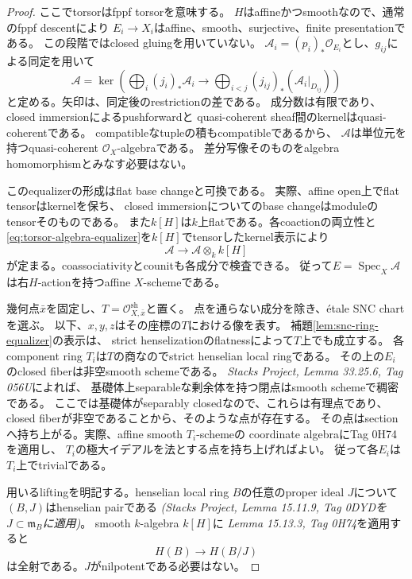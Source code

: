 \documentclass[uplatex,dvipdfmx,11pt]{jsarticle}
\numberwithin{equation}{section}
\theoremstyle{plain}
\theoremstyle{definition}
\theoremstyle{remark}
\DeclareMathOperator{\Spec}{Spec}
\newcommand{\OO}{\mathcal O}
\begin{document}
\begin{proof}
ここでtorsorはfppf torsorを意味する。
$H$はaffineかつsmoothなので、通常のfppf descentにより
$E_i\to X_i$はaffine、smooth、surjective、finite presentationである。
この段階ではclosed gluingを用いていない。
$\mathcal A_i=(p_i)_*\OO_{E_i}$とし、$g_{ij}$による同定を用いて
\begin{equation}\label{eq:torsor-algebra-equalizer}
\mathcal A=\ker\left(
\bigoplus_i(j_i)_*\mathcal A_i\longrightarrow
\bigoplus_{i<j}(j_{ij})_*(\mathcal A_i|_{D_{ij}})
\right)
\end{equation}
と定める。矢印は、同定後のrestrictionの差である。
成分数は有限であり、closed immersionによるpushforwardと
quasi-coherent sheaf間のkernelはquasi-coherentである。
compatibleなtupleの積もcompatibleであるから、
$\mathcal A$は単位元を持つquasi-coherent $\OO_X$-algebraである。
差分写像そのものをalgebra homomorphismとみなす必要はない。

このequalizerの形成はflat base changeと可換である。
実際、affine open上でflat tensorはkernelを保ち、
closed immersionについてのbase changeはmoduleのtensorそのものである。
また$k[H]$は$k$上flatである。各coactionの両立性と
\eqref{eq:torsor-algebra-equalizer}を$k[H]$でtensorしたkernel表示により
\[
\mathcal A\longrightarrow\mathcal A\otimes_k k[H]
\]
が定まる。coassociativityとcounitも各成分で検査できる。
従って$E=\Spec_X\mathcal A$は右$H$-actionを持つaffine $X$-schemeである。

幾何点$\bar x$を固定し、$T=\OO^{\mathrm{sh}}_{X,\bar x}$と置く。
点を通らない成分を除き、étale SNC chartを選ぶ。
以下、$x,y,z$はその座標の$T$における像を表す。
補題\ref{lem:snc-ring-equalizer}の表示は、
strict henselizationのflatnessによって$T$上でも成立する。
各component ring $T_i$は$T$の商なのでstrict henselian local ringである。
その上の$E_i$のclosed fiberは非空smooth schemeである。
\emph{Stacks Project, Lemma 33.25.6, Tag 056U}によれば、
基礎体上separableな剰余体を持つ閉点はsmooth schemeで稠密である。
ここでは基礎体がseparably closedなので、これらは有理点であり、
closed fiberが非空であることから、そのような点が存在する。
その点はsectionへ持ち上がる。実際、affine smooth $T_i$-schemeの
coordinate algebraにTag 0H74を適用し、
$T_i$の極大イデアルを法とする点を持ち上げればよい。
従って各$E_i$は$T_i$上でtrivialである。

用いるliftingを明記する。henselian local ring $B$の任意のproper ideal
$J$について$(B,J)$はhenselian pairである
\emph{(Stacks Project, Lemma 15.11.9, Tag 0DYDを
$J\subset\mathfrak m_B$に適用)}。
smooth $k$-algebra $k[H]$に
\emph{Lemma 15.13.3, Tag 0H74}を適用すると
\[
H(B)\longrightarrow H(B/J)
\]
は全射である。$J$がnilpotentである必要はない。


\end{proof}
\end{document}
